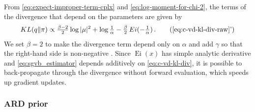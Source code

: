 \documentclass[a4paper,10pt,twocolumn]{article}
\begin{document}
From \eqref{eq:expect-improper-term-cplx} and \eqref{eq:log-moment-for-chi-2}, the terms of
the divergence that depend on the parameters are given by
\begin{equation}  \label{eq:c-vd-kl-div}
  KL(q\| \pi)
    \propto
      \tfrac{\beta-2}2 \log{\lvert \mu \rvert^2}
      + \log{\tfrac1{\alpha}}
      - \tfrac{\beta}2 \mathop{Ei}(- \tfrac1{\alpha})
      \,.
      \tag{\ref{eq:c-vd-kl-div-raw}'}
\end{equation}
We set $\beta = 2$ to make the divergence term depend only on $\alpha$ and add $\gamma$
so that the right-hand side is non-negative \citep[eq.(84)]{lapidoth_capacity_2003}.
%
Since $\mathop{Ei}(x)$ has simple analytic derivative and \eqref{eq:sgvb_estimator} depends additively
on \eqref{eq:c-vd-kl-div}, it is possible to back-propagate through the divergence without
forward evaluation, which speeds up gradient updates.


\subsubsection{ARD prior} %
\label{ssub:ard_prior}
\end{document}
